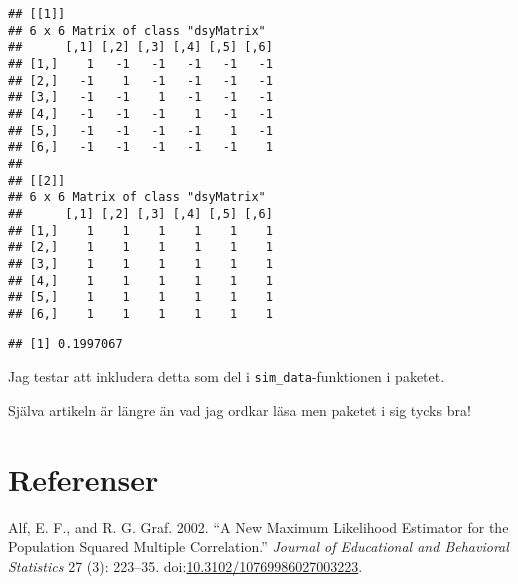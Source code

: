 \documentclass[]{article}
\newenvironment{Shaded}{\begin{snugshade}}{\end{snugshade}}
\newcommand{\KeywordTok}[1]{\textcolor[rgb]{0.13,0.29,0.53}{\textbf{{#1}}}}
\newcommand{\DecValTok}[1]{\textcolor[rgb]{0.00,0.00,0.81}{{#1}}}
\newcommand{\StringTok}[1]{\textcolor[rgb]{0.31,0.60,0.02}{{#1}}}
\newcommand{\CommentTok}[1]{\textcolor[rgb]{0.56,0.35,0.01}{\textit{{#1}}}}
\newcommand{\NormalTok}[1]{{#1}}
\begin{document}
\begin{verbatim}
## [[1]]
## 6 x 6 Matrix of class "dsyMatrix"
##      [,1] [,2] [,3] [,4] [,5] [,6]
## [1,]    1   -1   -1   -1   -1   -1
## [2,]   -1    1   -1   -1   -1   -1
## [3,]   -1   -1    1   -1   -1   -1
## [4,]   -1   -1   -1    1   -1   -1
## [5,]   -1   -1   -1   -1    1   -1
## [6,]   -1   -1   -1   -1   -1    1
## 
## [[2]]
## 6 x 6 Matrix of class "dsyMatrix"
##      [,1] [,2] [,3] [,4] [,5] [,6]
## [1,]    1    1    1    1    1    1
## [2,]    1    1    1    1    1    1
## [3,]    1    1    1    1    1    1
## [4,]    1    1    1    1    1    1
## [5,]    1    1    1    1    1    1
## [6,]    1    1    1    1    1    1
\end{verbatim}

\begin{Shaded}
\end{Shaded}

\begin{verbatim}
## [1] 0.1997067
\end{verbatim}

Jag testar att inkludera detta som del i \texttt{sim\_data}-funktionen i
paketet.

Själva artikeln är längre än vad jag ordkar läsa men paketet i sig tycks
bra!

\section*{Referenser}\label{referenser}

\hypertarget{refs}{}
\hypertarget{ref-Alf2002}{}
Alf, E. F., and R. G. Graf. 2002. ``A New Maximum Likelihood Estimator
for the Population Squared Multiple Correlation.'' \emph{Journal of
Educational and Behavioral Statistics} 27 (3): 223--35.
doi:\href{https://doi.org/10.3102/10769986027003223}{10.3102/10769986027003223}.
\end{document}

